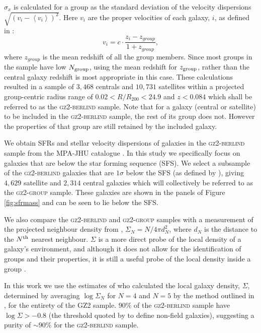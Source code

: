 \documentclass[useAMS,usenatbib]{mn2e}
\begin{document}
$\sigma_x$ is calculated for a group as the standard deviation of the velocity dispersions $\sqrt{(v_i - \left< v_i\right>)^2}$. Here $v_i$ are the proper velocities of each galaxy, $i$, as defined in \cite{danese80}:
\begin{equation}\label{eq:propervel}
v_i = c \cdot \frac{z_i - z_{group}}{1 + z_{group}},
\end{equation}
where $z_{group}$ is the mean redshift of all the group members. Since most groups in the sample have low $N_{\rm{group}}$, using the mean redshift for $z_{\rm{group}}$, rather than the central galaxy redshift is most appropriate in this case. These calculations resulted in a sample of $3,468$ centrals and $10,731$ satellites within a projected group-centric radius range of $0.02 < R/R_{200} < 24.9$ and $z < 0.084$ which shall be referred to as the \textsc{gz2-berlind} sample. Note that for a galaxy (central or satellite) to be included in the \textsc{gz2-berlind} sample, the rest of its group does not. However the properties of that group are still retained by the included galaxy. 

We obtain SFRs and stellar velocity dispersions of galaxies in the \textsc{gz2-berlind} sample from the MPA-JHU catalogue \citep{kauffmann03, brinchmann04}. In this study we specifically focus on galaxies that are below the star forming sequence (SFS). We select a subsample of the \textsc{gz2-berlind} galaxies that are $1\sigma$ below the SFS (as defined by \cite{peng10}), giving $4,629$ satellite and $2,314$ central galaxies which will collectively be referred to as the \textsc{gz2-group} sample. These galaxies are shown in the panels of Figure \ref{fig:sfrmass} and can be seen to lie below the SFS.

We also compare the \textsc{gz2-berlind} and \textsc{gz2-group} samples with a measurement of the projected neighbour density from \cite{Baldry06}, $\Sigma_N = N/4\pi d_N^2$, where $d_N$ is the distance to the $N^{\rm{th}}$ nearest neighbour. $\Sigma$ is a more direct probe of the local density of a galaxy's environment, and although it does not allow for the identification of groups and their properties, it is still a useful probe of the local density inside a group  \cite[see][for a comparison of various environment parametrisations]{muldrew12}.

In this work we use the estimates of \cite{Bamford09} who calculated the local galaxy density, $\Sigma$, determined by averaging $\log\Sigma_N$ for $N = 4$ and $N=5$ by the method outlined in \citet{Baldry06}, for the entirety of the GZ2 sample. $90\%$ of the \textsc{gz2-berlind} sample have $\log\Sigma > -0.8$ (the threshold quoted by \citealt{Baldry06} to define non-field galaxies), suggesting a purity of $\sim90\%$ for the \textsc{gz2-berlind} sample.
\end{document}
